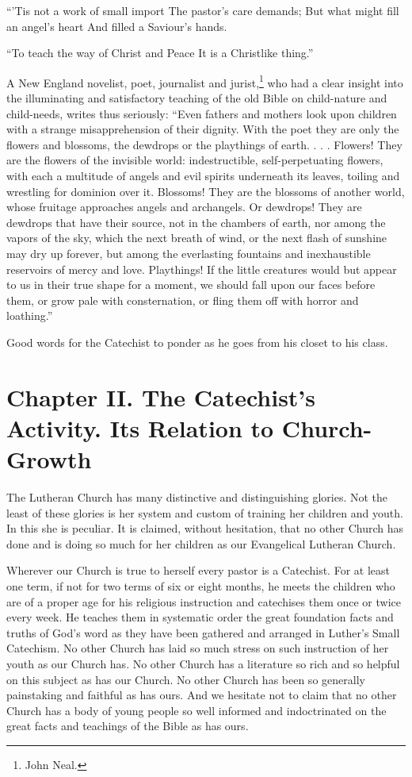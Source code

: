 “’Tis not a work of small import
The pastor’s care demands;
But what might fill an angel’s heart
And filled a Saviour’s hands.

“To teach the way of Christ and Peace
It is a Christlike thing.”

A New England novelist, poet, journalist and jurist,\footnote{John Neal.} who had a clear insight into the illuminating and satisfactory teaching of the old Bible on child-nature and child-needs, writes thus seriously: “Even fathers and mothers look upon children
with a strange misapprehension of their dignity. With the poet they are only the flowers and blossoms, the dewdrops or the playthings of earth. . . . Flowers! They are the flowers of the invisible world: indestructible, self-perpetuating flowers, with each a multitude of angels and evil spirits underneath its leaves, toiling and wrestling for dominion over it. Blossoms! They are the blossoms of another world, whose fruitage approaches angels and archangels. Or dewdrops! They are dewdrops that have their source, not in the chambers of earth, nor among the vapors of the sky, which the next breath of wind, or the next flash of sunshine may dry up forever, but among the everlasting fountains and inexhaustible reservoirs of mercy and love. Playthings! If the little creatures would but appear to us in their true shape for a moment, we should fall upon our faces before them, or grow pale with consternation, or fling them off with horror and loathing.”

Good words for the Catechist to ponder as he goes from his closet to his class.

\chapter[Chapter II. The Catechist’s Activity]{Chapter II. The Catechist’s Activity. Its Relation to Church-Growth}

The Lutheran Church has many distinctive and distinguishing glories. Not the least of these glories is her system and custom of training her children and youth. In this she is peculiar. It is claimed, without hesitation, that no other Church has done and is doing so much for her children as our Evangelical Lutheran Church.

 Wherever our Church is true to herself every pastor is a Catechist. For at least one term, if not for two terms of six or eight months, he meets the children who are of a proper age for his religious instruction and catechises them once or twice every week. He teaches them in systematic order the great foundation facts and truths of God’s word as they have been gathered and arranged in Luther’s Small Catechism. No other Church has laid so much stress on such instruction of her youth as our Church has. No other Church has a literature so rich and so helpful on this subject as has our Church. No other Church has been so generally painstaking and faithful as has ours. And we hesitate not to claim that no other Church has a body of young
people so well informed and indoctrinated on the great facts and teachings of the Bible as has ours.

